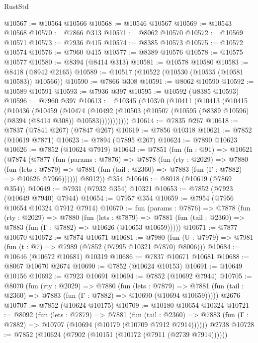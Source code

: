 \begin{lexlean}{RustStd}
\begin{coremodule}
@10567 := @10564 @10566
@10568 := @10546 @10567
@10569 := @10543 @10568
@10570 := @7866 @313
@10571 := @8062 @10570
@10572 := @10569 @10571
@10573 := @7936 @415
@10574 := @8385 @10573
@10575 := @10572 @10574
@10576 := @7960 @415
@10577 := @8389 @10576
@10578 := @10575 @10577
@10580 := @8394 (@8414 @313)
@10581 := @10578 @10580
@10583 := @8418 (@8942 @2165)
@10589 := @10517 (@10522 (@10530 (@10535 (@10581 @10583)) @10566))
@10590 := @7866 @308
@10591 := @8062 @10590
@10592 := @10589 @10591
@10593 := @7936 @397
@10595 := @10592 (@8385 @10593)
@10596 := @7960 @397
@10613 := @10345
    (@10370
      (@10411
        (@10413
          (@10415
            (@10436
              (@10459
                (@10474
                  (@10492
                    (@10503 (@10507 (@10595 (@8389 @10596) (@8394 (@8414 @308)) @10583)))))))))))
@10614 := @7835 @267
@10618 := @7837 (@7841 @267) (@7847 @267)
@10619 := @7856 @10318
@10621 := @7852 (@10619 @7871)
@10623 := @7894 (@7895 @267)
@10624 := @7890 @10623
@10626 := @7852 (@10624 @7919)
@10643 := @7851
    (fun (fn : @91) =>
    @10621
      (@7874
        (@7877
          (fun (params : @7876) =>
          @7878
            (fun (rty : @2029) =>
            @7880
              (fun (lets : @7879) =>
              @7881 (fun (tail : @2360) => @7883 (fun (Γ : @7882) => @10626 @7966))))))
        @8012))
    @354
@10646 := @8018 (@10619 (@7869 @354))
@10649 := @7931 (@7932 @354) @10321
@10653 := @7852 (@7923 (@10649 @7940) @7944)
@10654 := @7957 @354
@10659 := @7954 (@7956 @10654 @10324 @7912 @7914)
@10670 := fun (params : @7876) =>
  @7878
    (fun (rty : @2029) =>
    @7880
      (fun (lets : @7879) =>
      @7881 (fun (tail : @2360) => @7883 (fun (Γ : @7882) => @10626 (@10653 @10659)))))
@10671 := @7877 @10670
@10672 := @7874 @10671
@10681 := @7980
    (fun (U : @7979) => @7981 (fun (t : @7) => @7989 (@7852 (@7995 @10321 @7870) @8006)))
@10684 := @10646 (@10672 @10681) @10319
@10686 := @7837 @10671 @10681
@10688 := @8067 @10670 @2674
@10690 := @7852 (@10624 @10153)
@10691 := @10649 @10156
@10692 := @7923 @10691
@10694 := @7852 (@10692 @7944)
@10705 := @8070
    (fun (rty : @2029) =>
    @7880
      (fun (lets : @7879) =>
      @7881 (fun (tail : @2360) => @7883 (fun (Γ : @7882) => @10690 (@10694 @10659)))))
    @2676
@10707 := @7852 (@10624 @10175)
@10709 := @10180 @10654 @10324
@10721 := @8092
    (fun (lets : @7879) =>
    @7881
      (fun (tail : @2360) =>
      @7883 (fun (Γ : @7882) => @10707 (@10694 (@10179 (@10709 @7912 @7914))))))
    @2738
@10728 := @7852 (@10624 (@7902 (@10151 (@10172 (@7911 (@2739 @7914))))))

\end{coremodule}
\end{lexlean}

